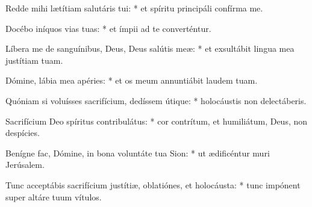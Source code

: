 Redde mihi lætítiam salutáris tui: * et spíritu principáli confírma me.

Docébo iníquos vias tuas: * et ímpii ad te converténtur.

Líbera me de sanguínibus, Deus, Deus salútis meæ: * et exsultábit lingua mea justítiam tuam.

Dómine, lábia mea apéries: * et os meum annuntiábit laudem tuam.

Quóniam si voluísses sacrifícium, dedíssem útique: * holocáustis non delectáberis.

Sacrifícium Deo spíritus contribulátus: * cor contrítum, et humiliátum, Deus, non despícies.

Benígne fac, Dómine, in bona voluntáte tua Sion: * ut ædificéntur muri Jerúsalem.

Tunc acceptábis sacrifícium justítiæ, oblatiónes, et holocáusta: * tunc impónent super altáre tuum vítulos.

\respice
